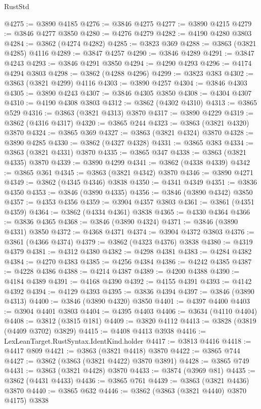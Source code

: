 \begin{lexlean}{RustStd}
\begin{coremodule}
@4275 := @3890 @4185
@4276 := @3846 @4275
@4277 := @3890 @4215
@4279 := @3846 @4277 @3850
@4280 := @4276 @4279
@4282 := @4190 @4280 @3803
@4284 := @3862 (@4274 @4282)
@4285 := @3823 @369
@4288 := @3863 (@3821 @4285) @4116
@4289 := @3847 @4257
@4290 := @3846 @4289
@4291 := @3847 @4243
@4293 := @3846 @4291 @3850
@4294 := @4290 @4293
@4296 := @4174 @4294 @3803
@4298 := @3862 (@4288 @4296)
@4299 := @3823 @383
@4302 := @3863 (@3821 @4299) @4116
@4303 := @3890 @4257
@4304 := @3846 @4303
@4305 := @3890 @4243
@4307 := @3846 @4305 @3850
@4308 := @4304 @4307
@4310 := @4190 @4308 @3803
@4312 := @3862 (@4302 @4310)
@4313 := @3865 @529
@4316 := @3863 (@3821 @4313) @3870
@4317 := @3890 @4229
@4319 := @3862 (@4316 @4317)
@4320 := @3865 @244
@4323 := @3863 (@3821 @4320) @3870
@4324 := @3865 @369
@4327 := @3863 (@3821 @4324) @3870
@4328 := @3890 @4285
@4330 := @3862 (@4327 @4328)
@4331 := @3865 @383
@4334 := @3863 (@3821 @4331) @3870
@4335 := @3865 @347
@4338 := @3863 (@3821 @4335) @3870
@4339 := @3890 @4299
@4341 := @3862 (@4338 @4339)
@4342 := @3865 @361
@4345 := @3863 (@3821 @4342) @3870
@4346 := @3890 @4271
@4349 := @3862 (@4345 @4346) @3838
@4350 := @4341 @4349
@4351 := @3836 @4350
@4353 := @3846 (@3890 @4335)
@4356 := @3846 (@3890 @4342) @3850
@4357 := @4353 @4356
@4359 := @3904 @4357 @3803
@4361 := @3861 (@4351 @4359)
@4364 := @3862 (@4334 @4361) @3838
@4365 := @4330 @4364
@4366 := @3836 @4365
@4368 := @3846 (@3890 @4324)
@4371 := @3846 (@3890 @4331) @3850
@4372 := @4368 @4371
@4374 := @3904 @4372 @3803
@4376 := @3861 (@4366 @4374)
@4379 := @3862 (@4323 @4376) @3838
@4380 := @4319 @4379
@4381 := @4312 @4380
@4382 := @4298 @4381
@4383 := @4284 @4382
@4384 := @4270 @4383
@4385 := @4256 @4384
@4386 := @4242 @4385
@4387 := @4228 @4386
@4388 := @4214 @4387
@4389 := @4200 @4388
@4390 := @4184 @4389
@4391 := @4168 @4390
@4392 := @4155 @4391
@4393 := @4142 @4392
@4394 := @4129 @4393
@4395 := @3836 @4394
@4397 := @3846 (@3890 @4313)
@4400 := @3846 (@3890 @4320) @3850
@4401 := @4397 @4400
@4403 := @3904 @4401 @3803
@4404 := @4395 @4403
@4406 := @3634 (@4110 @4404)
@4408 := @3812 (@3815 @181)
@4409 := @3820 @4112
@4413 := @3828 (@3819 (@4409 @3702) @3829)
@4415 := @4408 @4413 @3938
@4416 := LexLeanTarget.RustSyntax.IdentKind.holder
@4417 := @3813 @4416
@4418 := @4417 @809
@4421 := @3863 (@3821 @4418) @3870
@4422 := @3865 @744
@4427 := @3862 (@3863 (@3821 @4422) @3870 @3891)
@4428 := @3865 @749
@4431 := @3863 (@3821 @4428) @3870
@4433 := @3874 (@3969 @81)
@4435 := @3862 (@4431 @4433)
@4436 := @3865 @761
@4439 := @3863 (@3821 @4436) @3870
@4440 := @3865 @632
@4446 := @3862 (@3863 (@3821 @4440) @3870 @4175) @3838

\end{coremodule}
\end{lexlean}
